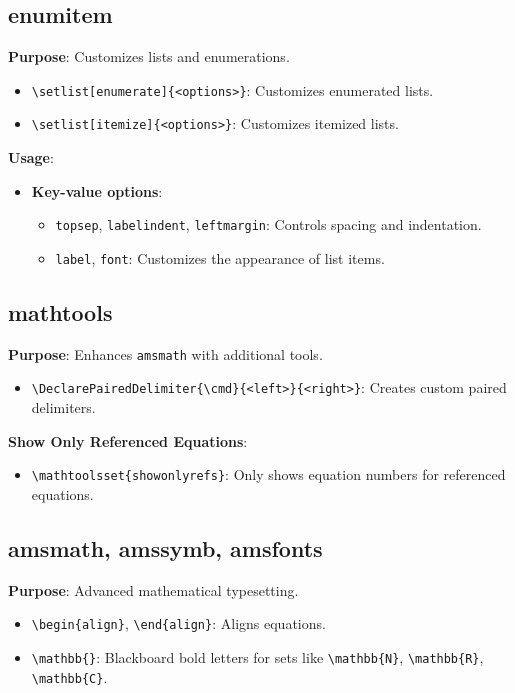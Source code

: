 \documentclass[12pt,twoside]{report}
\begin{document}
\subsection{enumitem}
\textbf{Purpose}: Customizes lists and enumerations.
\begin{itemize}
    \item \verb|\setlist[enumerate]{<options>}|: Customizes enumerated lists.
    \item \verb|\setlist[itemize]{<options>}|: Customizes itemized lists.
\end{itemize}

\textbf{Usage}:
\begin{itemize}
    \item \textbf{Key-value options}:
    \begin{itemize}
        \item \texttt{topsep}, \texttt{labelindent}, \texttt{leftmargin}: Controls spacing and indentation.
        \item \texttt{label}, \texttt{font}: Customizes the appearance of list items.
    \end{itemize}
\end{itemize}

\subsection{mathtools}
\textbf{Purpose}: Enhances \texttt{amsmath} with additional tools.
\begin{itemize}
    \item \verb|\DeclarePairedDelimiter{\cmd}{<left>}{<right>}|: Creates custom paired delimiters.
\end{itemize}
\textbf{Show Only Referenced Equations}:
\begin{itemize}
    \item \verb|\mathtoolsset{showonlyrefs}|: Only shows equation numbers for referenced equations.
\end{itemize}

\subsection{amsmath, amssymb, amsfonts}
\textbf{Purpose}: Advanced mathematical typesetting.
\begin{itemize}
    \item \verb|\begin{align}|, \verb|\end{align}|: Aligns equations.
    \item \verb|\mathbb{}|: Blackboard bold letters for sets like \verb|\mathbb{N}|, \verb|\mathbb{R}|, \verb|\mathbb{C}|.
\end{itemize}
\end{document}

